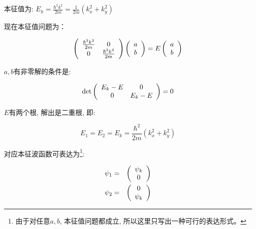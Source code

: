 \begin{enumerate}
本征值为: $E_k = \frac{\hbar^2 k^2}{2m} = \frac{1}{2m}\left( k_x^2 +
k_y^2 \right)$

现在本征值问题为：

\begin{equation*}
\left( {\begin{array}{*{20}c}
   {\frac{\hbar^2 k^2}{2m}} & {0}  \\
   {0} & {\frac{\hbar^2 k^2}{2m}}  \\
 \end{array} } \right)
\left( {\begin{array}{*{20}c}
   {a}  \\
   {b}  \\
 \end{array} } \right)
= E \left( {\begin{array}{*{20}c}
   {a}  \\
   {b}  \\
 \end{array} } \right)
\end{equation*}

$a, b$有非零解的条件是:

\begin{equation*}
\det \left( {\begin{array}{*{20}c}
   {E_k -E} & {0}  \\
   {0} & {E_k -E}  \\
 \end{array} } \right) = 0
\end{equation*}

$E$有两个根, 解出是二重根, 即:

\begin{equation*}
E_1 = E_2 = E_k = \frac{\hbar^2}{2m}\left( k_x^2 + k_y^2 \right)
\end{equation*}

对应本征波函数可表达为\footnote{由于对任意$a, b$, 本征值问题都成立,
所以这里只写出一种可行的表达形式。}:

\begin{eqnarray*}
  \psi_1 &=& \left( {\begin{array}{*{20}c}
   {\psi_k }  \\
   {0}  \\
 \end{array} } \right) \\
  \psi_2 &=& \left( {\begin{array}{*{20}c}
   {0 }  \\
   {\psi_k}  \\
 \end{array} } \right)
\end{eqnarray*}



\end{enumerate}
